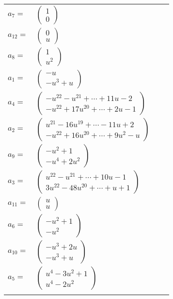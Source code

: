 \documentclass[1p]{elsarticle_modified}
\theoremstyle{definition}
\begin{document}
\begin{tabular}{m{7pt} m{180pt} m{7pt} m{180pt} }
\flushright $a_{7}=$&$\begin{pmatrix}1\\0\end{pmatrix}$ \\
\flushright $a_{12}=$&$\begin{pmatrix}0\\u\end{pmatrix}$ \\
\flushright $a_{8}=$&$\begin{pmatrix}1\\u^2\end{pmatrix}$ \\
\flushright $a_{1}=$&$\begin{pmatrix}- u\\- u^3+u\end{pmatrix}$ \\
\flushright $a_{4}=$&$\begin{pmatrix}- u^{22}- u^{21}+\cdots+11 u-2\\- u^{22}+17 u^{20}+\cdots+2 u-1\end{pmatrix}$ \\
\flushright $a_{2}=$&$\begin{pmatrix}u^{21}-16 u^{19}+\cdots-11 u+2\\- u^{22}+16 u^{20}+\cdots+9 u^2- u\end{pmatrix}$ \\
\flushright $a_{9}=$&$\begin{pmatrix}- u^2+1\\- u^4+2 u^2\end{pmatrix}$ \\
\flushright $a_{3}=$&$\begin{pmatrix}u^{22}- u^{21}+\cdots+10 u-1\\3 u^{22}-48 u^{20}+\cdots+u+1\end{pmatrix}$ \\
\flushright $a_{11}=$&$\begin{pmatrix}u\\u\end{pmatrix}$ \\
\flushright $a_{6}=$&$\begin{pmatrix}- u^2+1\\- u^2\end{pmatrix}$ \\
\flushright $a_{10}=$&$\begin{pmatrix}- u^3+2 u\\- u^3+u\end{pmatrix}$ \\
\flushright $a_{5}=$&$\begin{pmatrix}u^4-3 u^2+1\\u^4-2 u^2\end{pmatrix}$\\&\end{tabular}
\end{document}
